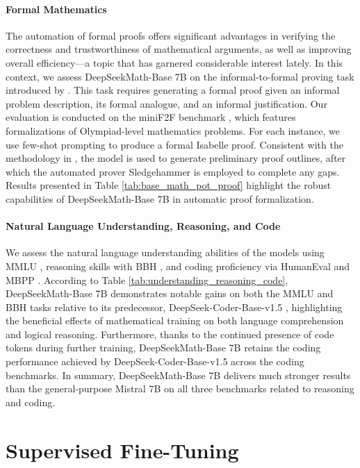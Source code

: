 \begin{itemize}[topsep=0pt]
\paragraph{Formal Mathematics}

The automation of formal proofs offers significant advantages in verifying the correctness and trustworthiness of mathematical arguments, as well as improving overall efficiency—a topic that has garnered considerable interest lately. In this context, we assess DeepSeekMath-Base 7B on the informal-to-formal proving task introduced by \citep{dsp_proof}. This task requires generating a formal proof given an informal problem description, its formal analogue, and an informal justification. Our evaluation is conducted on the miniF2F benchmark \citep{minif2f}, which features formalizations of Olympiad-level mathematics problems. For each instance, we use few-shot prompting to produce a formal Isabelle proof. Consistent with the methodology in \cite{dsp_proof}, the model is used to generate preliminary proof outlines, after which the automated prover Sledgehammer \citep{sledgehammer} is employed to complete any gaps. Results presented in Table \ref{tab:base_math_pot_proof} highlight the robust capabilities of DeepSeekMath-Base 7B in automatic proof formalization.

\paragraph{Natural Language Understanding, Reasoning, and Code}

We assess the natural language understanding abilities of the models using MMLU \citep{mmlu}, reasoning skills with BBH \citep{bbh}, and coding proficiency via HumanEval \citep{codex} and MBPP \citep{mbpp}. According to Table \ref{tab:understanding_reasoning_code}, DeepSeekMath-Base 7B demonstrates notable gains on both the MMLU and BBH tasks relative to its predecessor, DeepSeek-Coder-Base-v1.5 \citep{deepseek-coder}, highlighting the beneficial effects of mathematical training on both language comprehension and logical reasoning. Furthermore, thanks to the continued presence of code tokens during further training, DeepSeekMath-Base 7B retains the coding performance achieved by DeepSeek-Coder-Base-v1.5 across the coding benchmarks. In summary, DeepSeekMath-Base 7B delivers much stronger results than the general-purpose Mistral 7B \citep{mistral} on all three benchmarks related to reasoning and coding.

\section{Supervised Fine-Tuning}


\end{itemize}

